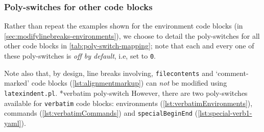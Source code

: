 \subsubsection{Poly-switches for other code blocks}
 Rather than repeat the examples shown for the environment code blocks (in
 \vref{sec:modifylinebreaks-environments}), we choose to detail the poly-switches for all
 other code blocks in \cref{tab:poly-switch-mapping}; note that each and every one of
 these poly-switches is \emph{off by default}, i.e, set to \texttt{0}.

 Note also that, by design, line breaks involving, \texttt{filecontents} and
 `comment-marked' code blocks (\vref{lst:alignmentmarkup}) can \emph{not} be modified
 using \texttt{latexindent.pl}. *{verbatim poly-switch} However,
 there are two poly-switches available for \texttt{verbatim} code blocks: environments
 (\vref{lst:verbatimEnvironments}), commands (\vref{lst:verbatimCommands}) and
 \texttt{specialBeginEnd} (\vref{lst:special-verb1-yaml}).
  

